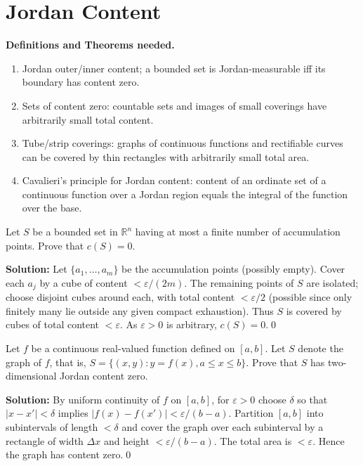 \section{Jordan Content}
\noindent\textbf{Definitions and Theorems needed.}
\begin{enumerate}[label=(\roman*)]
    \item Jordan outer/inner content; a bounded set is Jordan-measurable iff its boundary has content zero.
    \item Sets of content zero: countable sets and images of small coverings have arbitrarily small total content.
    \item Tube/strip coverings: graphs of continuous functions and rectifiable curves can be covered by thin rectangles with arbitrarily small total area.
    \item Cavalieri’s principle for Jordan content: content of an ordinate set of a continuous function over a Jordan region equals the integral of the function over the base.
\end{enumerate}



\begin{problembox}
Let \( S \) be a bounded set in \( \mathbb{R}^n \) having at most a finite number of accumulation points. Prove that \( c(S) = 0 \).
\end{problembox}

\noindent\textbf{Solution:}
Let $\{a_1,\dots,a_m\}$ be the accumulation points (possibly empty). Cover each $a_j$ by a cube of content $<\varepsilon/(2m)$. The remaining points of $S$ are isolated; choose disjoint cubes around each, with total content $<\varepsilon/2$ (possible since only finitely many lie outside any given compact exhaustion). Thus $S$ is covered by cubes of total content $<\varepsilon$. As $\varepsilon>0$ is arbitrary, $c(S)=0$.\qed


\begin{problembox}
Let \( f \) be a continuous real-valued function defined on \([a, b]\). Let \( S \) denote the graph of \( f \), that is, \( S = \{(x, y) : y = f(x), a \leq x \leq b\} \). Prove that \( S \) has two-dimensional Jordan content zero.
\end{problembox}

\noindent\textbf{Solution:}
By uniform continuity of $f$ on $[a,b]$, for $\varepsilon>0$ choose $\delta$ so that $|x-x'|<\delta$ implies $|f(x)-f(x')|<\varepsilon/(b-a)$. Partition $[a,b]$ into subintervals of length $<\delta$ and cover the graph over each subinterval by a rectangle of width $\Delta x$ and height $<\varepsilon/(b-a)$. The total area is $<\varepsilon$. Hence the graph has content zero.\qed


